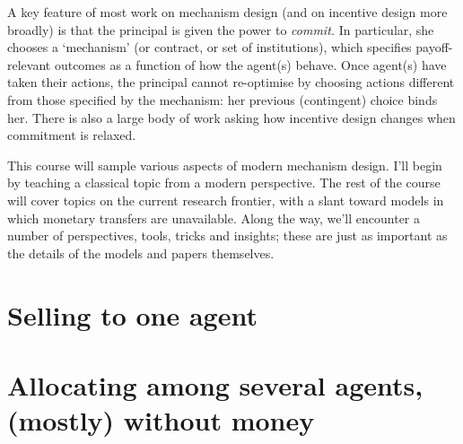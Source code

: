 \documentclass[11pt,letterpaper,reqno,oneside]{book}
\begin{document}
A key feature of most work on mechanism design (and on incentive design more broadly) is that the principal is given the power to \emph{commit.}
In particular, she chooses a `mechanism' (or contract, or set of institutions), which specifies payoff-relevant outcomes as a function of how the agent(s) behave.
Once agent(s) have taken their actions, the principal cannot re-optimise by choosing actions different from those specified by the mechanism: her previous (contingent) choice binds her.
There is also a large body of work asking how incentive design changes when commitment is relaxed.

This course will sample various aspects of modern mechanism design.
I'll begin by teaching a classical topic from a modern perspective.
The rest of the course will cover topics on the current research frontier, with a slant toward models in which monetary transfers are unavailable.
Along the way, we'll encounter a number of perspectives, tools, tricks and insights; these are just as important as the details of the models and papers themselves.



\chapter{Selling to one agent}
\label{ch1}






\chapter{Allocating among several agents, (mostly) without money}
\label{ch2}



\end{document}
